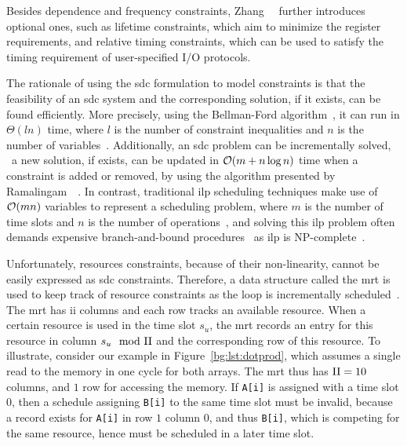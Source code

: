 Besides dependence and frequency constraints, Zhang~\etal~\cite{zhang13}
further introduces optional ones, such as lifetime constraints, which aim to
minimize the register requirements, and relative timing constraints, which can
be used to satisfy the timing requirement of user-specified I/O protocols.

The rationale of using the \gls{sdc} formulation to model constraints
is that the feasibility of an \gls{sdc} system and the corresponding
solution, if it exists, can be found efficiently.  More precisely, using the
Bellman-Ford algorithm~\cite{schrijver05}, it can run in $\Theta(l n)$ time,
where $l$ is the number of constraint inequalities and $n$ is the number
of variables~\cite{zhang13}.  Additionally, an \gls{sdc} problem can be
incrementally solved, \ie~a new solution, if exists, can be updated in $\operatorname{\mathcal{O}}(m
+ n \log n)$ time when a constraint is added or removed, by using the algorithm
presented by Ramalingam~\etal~\cite{ramalingam99}.  In contrast, traditional
\gls{ilp} scheduling techniques make use of $\operatorname{\mathcal{O}}(mn)$ variables to represent
a scheduling problem, where $m$ is the number of time slots and $n$ is the
number of operations~\cite{hwang91}, and solving this \gls{ilp} problem often
demands expensive branch-and-bound procedures~\cite{zhang13} as \gls{ilp} is
NP-complete~\cite{karp10}.

Unfortunately, resources constraints, because of their non-linearity, cannot
be easily expressed as \gls{sdc} constraints.  Therefore, a data structure
called the \gls{mrt} is used to keep track of resource constraints as the loop
is incrementally scheduled~\cite{canis14}.  The \gls{mrt} has \gls{ii} columns
and each row tracks an available resource.  When a certain resource is used in
the time slot $s_u$, the \gls{mrt} records an entry for this resource in column
$s_u \mod {\mathrm{II}}$ and the corresponding row of this resource.  To illustrate,
consider our example in Figure~\ref{bg:lst:dotprod}, which assumes a single
read to the memory in one cycle for both arrays.  The \gls{mrt} thus has $\mathrm{II} =
10$ columns, and $1$ row for accessing the memory.  If \verb|A[i]| is assigned
with a time slot $0$, then a schedule assigning \verb|B[i]| to the same time
slot must be invalid, because a record exists for \verb|A[i]| in row $1$ column
$0$, and thus \verb|B[i]|, which is competing for the same resource, hence must
be scheduled in a later time slot.

